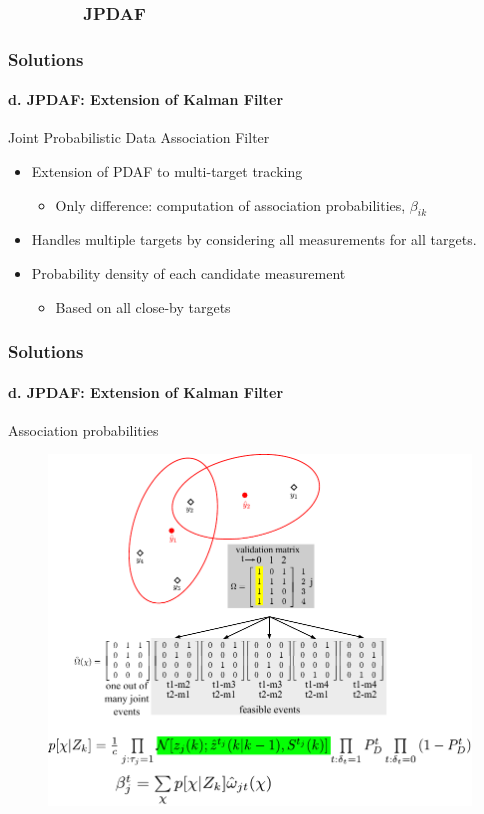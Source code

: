 \subsubsection{\ \ \ \ \ \ \ \ JPDAF }
\begin{frame}
\frametitle{Solutions}
\framesubtitle{d. JPDAF: Extension of Kalman Filter}
\mypagenum
	{\color{red} Joint Probabilistic Data Association Filter}
	\begin{itemize}
		\item Extension of PDAF to multi-target tracking	
			\begin{itemize}
				\item Only difference: computation of association probabilities, $\beta_{ik}$
			\end{itemize}
		\item Handles multiple targets by considering all measurements for all targets.  
		\item Probability density of each candidate measurement
			\begin{itemize}
				\item Based on all close-by targets
			\end{itemize}
	\end{itemize}
\end{frame}




\begin{frame}
\frametitle{Solutions}
\framesubtitle{d. JPDAF: Extension of Kalman Filter}
\mypagenum 	
Association probabilities
	\begin{figure}
		\includegraphics[height=0.80\textheight]{figs/TRK_JPDAF_twoTargetScenario.pdf}
	\end{figure}	
\end{frame}

